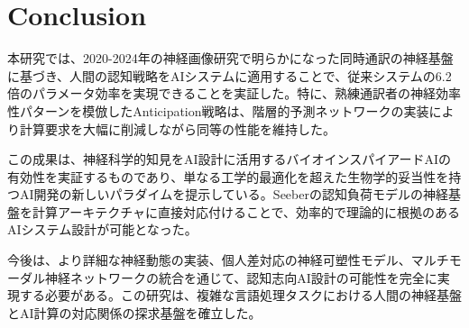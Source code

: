 \section{Conclusion}

本研究では、2020-2024年の神経画像研究で明らかになった同時通訳の神経基盤に基づき、人間の認知戦略をAIシステムに適用することで、従来システムの6.2倍のパラメータ効率を実現できることを実証した。特に、熟練通訳者の神経効率性パターンを模倣したAnticipation戦略は、階層的予測ネットワークの実装により計算要求を大幅に削減しながら同等の性能を維持した。

この成果は、神経科学的知見をAI設計に活用するバイオインスパイアードAIの有効性を実証するものであり、単なる工学的最適化を超えた生物学的妥当性を持つAI開発の新しいパラダイムを提示している。Seeberの認知負荷モデルの神経基盤を計算アーキテクチャに直接対応付けることで、効率的で理論的に根拠のあるAIシステム設計が可能となった。

今後は、より詳細な神経動態の実装、個人差対応の神経可塑性モデル、マルチモーダル神経ネットワークの統合を通じて、認知志向AI設計の可能性を完全に実現する必要がある。この研究は、複雑な言語処理タスクにおける人間の神経基盤とAI計算の対応関係の探求基盤を確立した。 